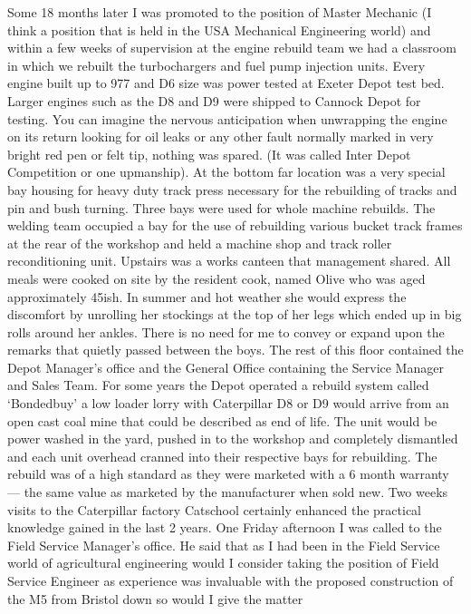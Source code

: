 
Some 18 months later I was promoted to the position of Master Mechanic (I think
a position that is held in the USA Mechanical Engineering world) and within a
few weeks of supervision at the engine rebuild team we had a classroom in which
we rebuilt the turbochargers and fuel pump injection units. Every engine built
up to 977 and D6 size was power tested at Exeter Depot test bed. Larger
engines such as the D8 and D9 were shipped to Cannock Depot for testing. You
can imagine the nervous anticipation when unwrapping the engine on its return
looking for oil leaks or any other fault normally marked in very bright red pen
or felt tip, nothing was spared. (It was called Inter Depot Competition or one
upmanship). At the bottom far location was a very special bay housing for
heavy duty track press necessary for the rebuilding of tracks and pin and bush
turning. Three bays were used for whole machine rebuilds. The welding team
occupied a bay for the use of rebuilding various bucket track frames at the
rear of the workshop and held a machine shop and track roller reconditioning
unit. Upstairs was a works canteen that management shared. All meals were
cooked on site by the resident cook, named Olive who was aged approximately
45ish. In summer and hot weather she would express the discomfort by unrolling
her stockings at the top of her legs which ended up in big rolls around her
ankles. There is no need for me to convey or expand upon the remarks that
quietly passed between the boys. The rest of this floor contained the Depot
Manager's office and the General Office containing the Service Manager and
Sales Team. For some years the Depot operated a rebuild system
called ‘Bondedbuy' a low loader lorry with Caterpillar D8 or D9 would arrive
from an open cast coal mine that could be described as end of life. The unit
would be power washed in the yard, pushed in to the workshop and completely
dismantled and each unit overhead cranned into their respective bays for
rebuilding. The rebuild was of a high standard as they were marketed with a 6
month warranty --- the same value as marketed by the manufacturer when sold new.
Two weeks visits to the Caterpillar factory Catschool certainly enhanced the
practical knowledge gained in the last 2 years. One Friday afternoon I was
called to the Field Service Manager's office. He said that as I had been in
the Field Service world of agricultural engineering would I consider taking the
position of Field Service Engineer as experience was invaluable with the
proposed construction of the M5 from Bristol down so would I give the matter
